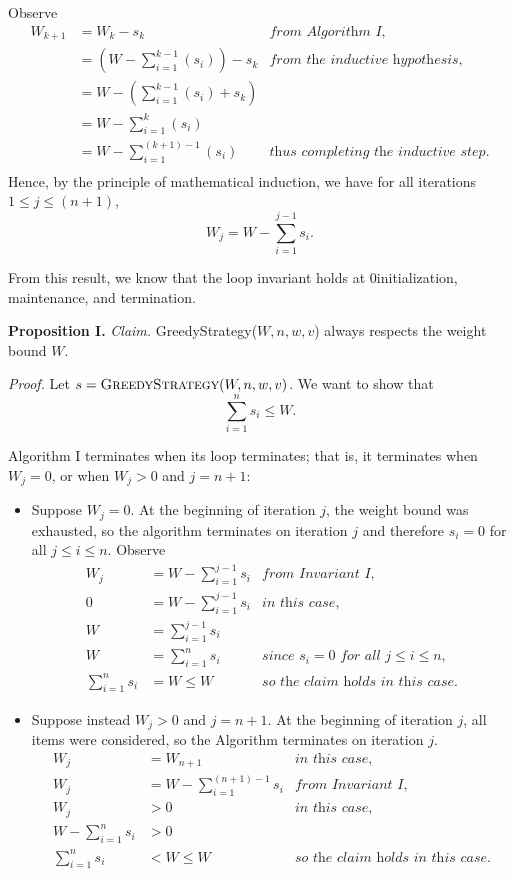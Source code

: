 \begin{enumerate}
\begin{solution}
Observe
\begin{align*}
W_{k+1}&=W_k-s_k&\textit{from Algorithm I,}\\
&=\left(W-\sum_{i=1}^{k-1}(s_i)\right)-s_k&\textit{from the inductive hypothesis,}\\
&=W-\left(\sum_{i=1}^{k-1}(s_i)+s_k\right)\\
&=W-\sum_{i=1}^{k}(s_i)\\
&=W-\sum_{i=1}^{(k+1)-1}(s_i)&\textit{thus completing the inductive step.}\\
\end{align*}
Hence, by the principle of mathematical induction, we have for all iterations $1\leq j\leq(n+1)$, \[W_j=W-\sum_{i=1}^{j-1}{s_i}.\] 

From this result, we know that the loop invariant holds at 0initialization, maintenance, and termination.

\textbf{Proposition I. }\textit{Claim. }{\sc GreedyStrategy}($W,n,w,v$) always respects the weight bound $W$.

\textit{Proof. }Let $s=\textsc{GreedyStrategy}(W,n,w,v)$. We want to show that \[\sum_{i=1}^n{s_i}\leq W.\]

Algorithm I terminates when its loop terminates; that is, it terminates when $W_j=0$, or when $W_j>0$ and $j=n+1$:
\begin{itemize}
    \item Suppose $W_j=0$. At the beginning of iteration $j$, the weight bound was exhausted, so the algorithm terminates on iteration $j$ and therefore $s_i=0$ for all $j\leq i\leq n$. Observe
    \begin{align*}
    W_j&=W-\sum_{i=1}^{j-1}{s_i}&\textit{from Invariant I,}\\
    0&=W-\sum_{i=1}^{j-1}{s_i}&\textit{in this case,}\\
    W&=\sum_{i=1}^{j-1}{s_i}\\
    W&=\sum_{i=1}^n{s_i}&\textit{since $s_i=0$ for all $j\leq i\leq n$,}\\
    \sum_{i=1}^n{s_i}&=W\leq W&\textit{so the claim holds in this case.}
    \end{align*}
    \item Suppose instead $W_j>0$ and $j=n+1$. At the beginning of iteration $j$, all items were considered, so the Algorithm terminates on iteration $j$.
    \begin{align*}
    W_j&=W_{n+1}&\textit{in this case,}\\
    W_j&=W-\sum_{i=1}^{(n+1)-1}{s_i}&\textit{from Invariant I,}\\
    W_j&>0&\textit{in this case,}\\
    W-\sum_{i=1}^{n}{s_i}&>0\\
    \sum_{i=1}^{n}{s_i}&<W\leq W&\textit{so the claim holds in this case.}
    \end{align*}
\end{itemize}


\end{solution}
\end{enumerate}
